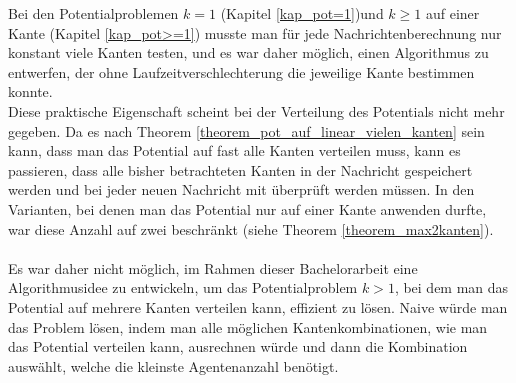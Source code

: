 Bei den Potentialproblemen $k = 1$ (Kapitel \ref{kap_pot=1})und $k \geq 1$ auf einer Kante (Kapitel \ref{kap_pot>=1}) musste man für jede Nachrichtenberechnung nur konstant viele Kanten testen, und es war daher möglich, einen Algorithmus zu entwerfen, der ohne Laufzeitverschlechterung die jeweilige Kante bestimmen konnte.
\\
Diese praktische Eigenschaft scheint bei der Verteilung des Potentials nicht mehr gegeben. Da es nach Theorem \ref{theorem_pot_auf_linear_vielen_kanten} sein kann, dass man das Potential auf fast alle Kanten verteilen muss, kann es passieren, dass alle bisher betrachteten Kanten in der Nachricht gespeichert werden und bei jeder neuen Nachricht mit überprüft werden müssen. In den Varianten, bei denen man das Potential nur auf einer Kante anwenden durfte, war diese Anzahl auf zwei beschränkt (siehe Theorem \ref{theorem_max2kanten}).
\\
\\
Es war daher nicht möglich, im Rahmen dieser Bachelorarbeit eine Algorithmusidee zu entwickeln, um das Potentialproblem $k > 1$, bei dem man das Potential auf mehrere Kanten verteilen kann, effizient zu lösen. Naive würde man das Problem lösen, indem man alle möglichen Kantenkombinationen, wie man das Potential verteilen kann, ausrechnen würde und dann die Kombination auswählt, welche die kleinste Agentenanzahl benötigt.


